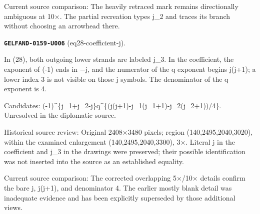 Current source comparison: The heavily retraced mark remains directionally ambiguous at 10×. The partial recreation types j\_2 and traces its branch without choosing an arrowhead there.\par\medskip
\par\noindent\leavevmode{}\label{GELFAND-0159-U006}\label{GELFAND-P001466:eq28-coefficient-j}\textbf{\texttt{GELFAND-0159-U006}} (eq28-coefficient-j).\nopagebreak[4]\par
In (28), both outgoing lower strands are labeled j\_3. In the coefficient, the exponent of (-1) ends in −j, and the numerator of the q exponent begins j(j+1); a lower index 3 is not visible on those j symbols. The denominator of the q exponent is 4.\par
Candidates: (-1)\textasciicircum{}\{j\_1+j\_2-j\}q\textasciicircum{}\{(j(j+1)-j\_1(j\_1+1)-j\_2(j\_2+1))/4\}. Unresolved in the diplomatic source.\par
Historical source review: Original 2408×3480 pixels; region (140,2495,2040,3020), within the examined enlargement (140,2495,2040,3300), 3×. Literal j in the coefficient and j\_3 in the drawings were preserved; their possible identification was not inserted into the source as an established equality.\par
Current source comparison: The corrected overlapping 5×/10× details confirm the bare j, j(j+1), and denominator 4. The earlier mostly blank detail was inadequate evidence and has been explicitly superseded by those additional views.\par\medskip
